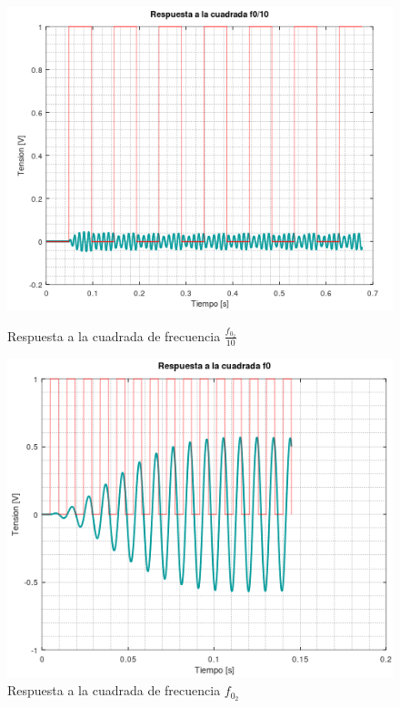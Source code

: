 \documentclass[11pt,a4paper]{report}
\begin{document}
\begin{figure}[h!]
\centering
\includegraphics[scale=0.85]{RtaCuadradaWo21.png}
\caption{Respuesta a la cuadrada de frecuencia $\frac{f_{0_{2}}}{10}$}
\includegraphics[scale=0.85]{RtaCuadradaWo22.png}
\caption{Respuesta a la cuadrada de frecuencia $f_{0_{2}}$}
\end{figure}
\clearpage
\end{document}
